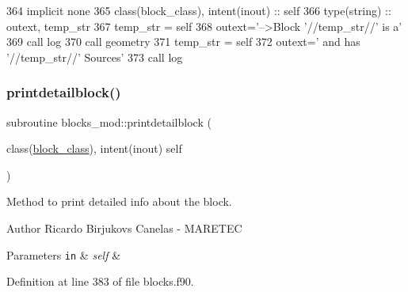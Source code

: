 \begin{DoxyCode}
364     \textcolor{keywordtype}{implicit none}
365     \textcolor{keywordtype}{class}(block\_class), \textcolor{keywordtype}{intent(inout)} :: self
366     \textcolor{keywordtype}{type}(string) :: outext, temp\_str
367     temp\_str = self%
368     outext=\textcolor{stringliteral}{'-->Block '}//temp\_str//\textcolor{stringliteral}{' is a'}
369     \textcolor{keyword}{call }log%
370     \textcolor{keyword}{call }geometry%
371     temp\_str = self%
372     outext=\textcolor{stringliteral}{'      and has '}//temp\_str//\textcolor{stringliteral}{' Sources'}
373     \textcolor{keyword}{call }log%
\end{DoxyCode}
\mbox{\label{namespaceblocks__mod_a10f356706988c45a255922fe70851488}} 
\subsubsection{\texorpdfstring{printdetailblock()}{printdetailblock()}}
{\footnotesize\ttfamily subroutine blocks\+\_\+mod\+::printdetailblock (\begin{DoxyParamCaption}\item[{class(\mbox{\hyperlink{structblocks__mod_1_1block__class}{block\+\_\+class}}), intent(inout)}]{self }\end{DoxyParamCaption})\hspace{0.3cm}{\ttfamily [private]}}



Method to print detailed info about the block. 

\begin{DoxyAuthor}{Author}
Ricardo Birjukovs Canelas -\/ M\+A\+R\+E\+T\+EC 
\end{DoxyAuthor}

\begin{DoxyParams}[1]{Parameters}
\mbox{\tt in}  & {\em self} & \\
\hline
\end{DoxyParams}


Definition at line 383 of file blocks.\+f90.


